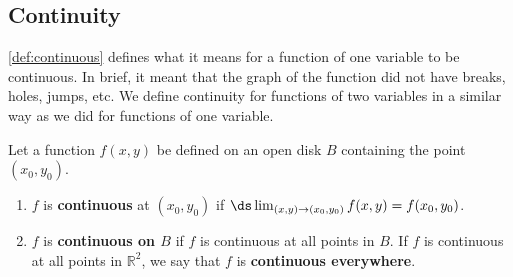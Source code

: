 \subsection*{Continuity}

\autoref{def:continuous} defines what it means for a function of one variable to be continuous. In brief, it meant that the graph of the function did not have breaks, holes, jumps, etc. We define continuity for functions of two variables in a similar way as we did for functions of one variable.

{Let a function $f(x,y)$ be defined on an open disk $B$ containing the point $(x_0,y_0)$. 

\begin{enumerate}
	\item $f$ is \textbf{continuous} at $(x_0,y_0)$ if $\ds\lim_{(x,y)\to(x_0,y_0)} f(x,y) = f(x_0,y_0)$.
	\item	$f$ is \textbf{continuous on $B$} if $f$ is continuous at all points in $B$. If $f$ is continuous at all points in $\mathbb{R}^2$, we say that $f$ is \textbf{continuous everywhere}.
\end{enumerate}}

